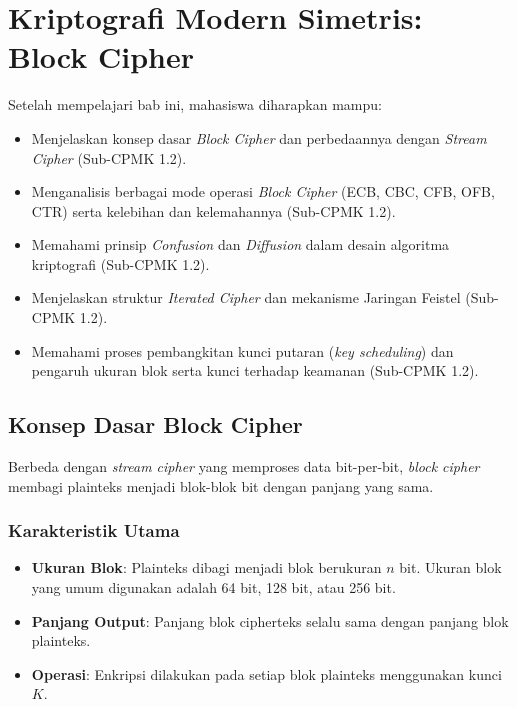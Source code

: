 \documentclass[../main.tex]{subfiles}
\begin{document}
\chapter{Kriptografi Modern Simetris: Block Cipher}

\begin{learningoutcome}
Setelah mempelajari bab ini, mahasiswa diharapkan mampu:
\begin{itemize}
    \item Menjelaskan konsep dasar \textit{Block Cipher} dan perbedaannya dengan \textit{Stream Cipher} (Sub-CPMK 1.2).
    \item Menganalisis berbagai mode operasi \textit{Block Cipher} (ECB, CBC, CFB, OFB, CTR) serta kelebihan dan kelemahannya (Sub-CPMK 1.2).
    \item Memahami prinsip \textit{Confusion} dan \textit{Diffusion} dalam desain algoritma kriptografi (Sub-CPMK 1.2).
    \item Menjelaskan struktur \textit{Iterated Cipher} dan mekanisme Jaringan Feistel (Sub-CPMK 1.2).
    \item Memahami proses pembangkitan kunci putaran (\textit{key scheduling}) dan pengaruh ukuran blok serta kunci terhadap keamanan (Sub-CPMK 1.2).
\end{itemize}
\end{learningoutcome}

\section{Konsep Dasar Block Cipher}
Berbeda dengan \textit{stream cipher} yang memproses data bit-per-bit, \textit{block cipher} membagi plainteks menjadi blok-blok bit dengan panjang yang sama.

\subsection{Karakteristik Utama}
\begin{itemize}
    \item \textbf{Ukuran Blok}: Plainteks dibagi menjadi blok berukuran $n$ bit. Ukuran blok yang umum digunakan adalah 64 bit, 128 bit, atau 256 bit.
    \item \textbf{Panjang Output}: Panjang blok cipherteks selalu sama dengan panjang blok plainteks.
    \item \textbf{Operasi}: Enkripsi dilakukan pada setiap blok plainteks menggunakan kunci $K$.
\end{itemize}
\end{document}
